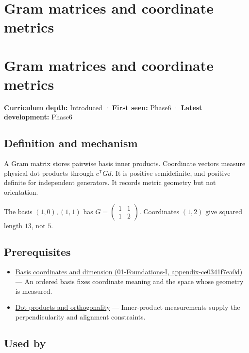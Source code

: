 \hypertarget{appendix-3b863809f82a}{}
\section*{Gram matrices and coordinate metrics}
\section{Gram matrices and coordinate metrics}\label{gram-matrices-and-coordinate-metrics}

\textbf{Curriculum depth:} Introduced · \textbf{First seen:} Phase6 · \textbf{Latest development:} Phase6

\subsection{Definition and mechanism}\label{definition-and-mechanism}

A Gram matrix stores pairwise basis inner products. Coordinate vectors measure physical dot products through \(c^\mathsf TGd\). It is positive semidefinite, and positive definite for independent generators. It records metric geometry but not orientation.

The basis \((1,0),(1,1)\) has \(G=\begin{pmatrix}1&1\\1&2\end{pmatrix}\). Coordinates \((1,2)\) give squared length \(13\), not \(5\).

\subsection{Prerequisites}\label{prerequisites}

\begin{itemize}
\tightlist
\item
  \href{}{Basis coordinates and dimension (01-Foundations-I, appendix-ce0341f7ea0d)} --- An ordered basis fixes coordinate meaning and the space whose geometry is measured.
\item
  \hyperref[appendix-8bc4e8fc547c]{Dot products and orthogonality} --- Inner-product measurements supply the perpendicularity and alignment constraints.
\end{itemize}

\subsection{Used by}\label{used-by}


